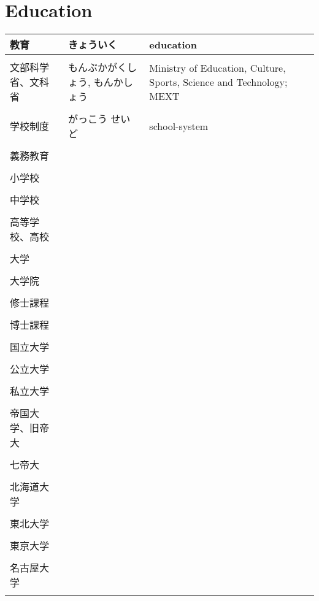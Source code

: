\documentclass{article}
\newcommand\tabni[1][0.2cm]{\hspace*{#1}}
\begin{document}
\section{ \tabni Education }
\begin{tabular}{ l | p{6.7cm} | p{7.5cm} }
教育 &  きょういく  & education \\ \hline \\[-1em]
文部科学省、文科省 &  もんぶかがくしょう, もんかしょう  & Ministry of Education, Culture, Sports, Science and Technology; MEXT \\ \hline \\[-1em]
学校制度 &  がっこう せいど   & school-system \\ \hline \\[-1em]
義務教育 & & \\ \hline \\[-1em]
小学校 & & \\ \hline \\[-1em]
中学校 & & \\ \hline \\[-1em]
高等学校、高校 & & \\ \hline \\[-1em]
大学 & & \\ \hline \\[-1em]
大学院  & & \\ \hline \\[-1em]
修士課程  & & \\ \hline \\[-1em]
博士課程  & & \\ \hline \\[-1em]
国立大学 & & \\ \hline \\[-1em]
公立大学 & & \\ \hline \\[-1em]
私立大学 & & \\ \hline \\[-1em]
帝国大学、旧帝大 & & \\ \hline \\[-1em]
七帝大 & & \\ \hline \\[-1em]
北海道大学 & & \\ \hline \\[-1em]
東北大学 & & \\ \hline \\[-1em]
東京大学 & & \\ \hline \\[-1em]
名古屋大学 & & \\ \hline \\[-1em]

\end{tabular}
\end{document}
